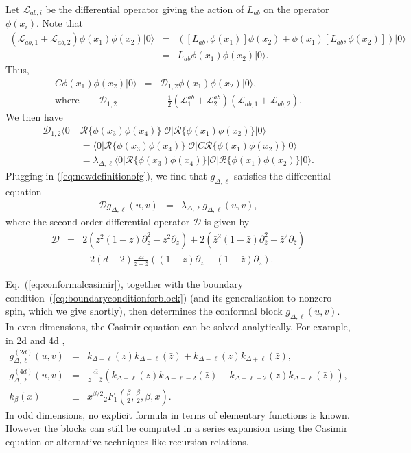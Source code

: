 \documentclass[12pt]{article}
\numberwithin{equation}{section}
\newcommand\be{\begin{eqnarray}}
\newcommand\ee{\end{eqnarray}}
\newcommand\f\phi
\newcommand\cO{\mathcal{O}}
\newcommand\p[1]{\left(#1\right)}
\newcommand\ptl\partial
\newcommand\<\langle
\renewcommand\>\rangle
\newcommand\nn{\nonumber}
\renewcommand\.{\cdot}
\newcommand\De{\Delta}
\renewcommand\l\lambda
\newcommand\cL{\mathcal{L}}
\newcommand\cD{\mathcal{D}}
\begin{document}
Let $\cL_{ab,i}$ be the differential operator giving the action of $L_{ab}$ on the operator $\f(x_i)$.  Note that
\be
(\cL_{ab,1}+\cL_{ab,2})\f(x_1)\f(x_2)|0\> &=& \p{[L_{ab},\f(x_1)]\f(x_2)+\f(x_1)[L_{ab},\f(x_2)]}|0\>\nn\\
&=& L_{ab}\f(x_1)\f(x_2)|0\>.
\ee
Thus, 
\be
C\f(x_1)\f(x_2)|0\> &=& \cD_{1,2}\f(x_1)\f(x_2)|0\>,\nn\\
\textrm{where}\qquad\cD_{1,2} &\equiv& -\frac 1 2(\cL^{ab}_{1}+\cL^{ab}_{2})(\cL_{ab,1}+\cL_{ab,2}).
\ee
We then have
\begin{align}
\cD_{1,2}\<0|&\mathcal{R}\{\f(x_3)\f(x_4)\}|\cO|\mathcal{R}\{\f(x_1)\f(x_2)\}|0\>\nn\\
&=
\<0|\mathcal{R}\{\f(x_3)\f(x_4)\}|\cO| C\mathcal{R}\{\f(x_1)\f(x_2)\}|0\>\nn\\
&= \l_{\De,\ell}\<0|\mathcal{R}\{\f(x_3)\f(x_4)\}|\cO|\mathcal{R}\{\f(x_1)\f(x_2)\}|0\>.
\end{align}
Plugging in (\ref{eq:newdefinitionofg}), we find that $g_{\De,\ell}$ satisfies the differential equation 
\be
\label{eq:conformalcasimir}
\cD g_{\De,\ell}(u,v) &=& \l_{\De,\ell} g_{\De,\ell}(u,v),
\ee
where the second-order differential operator $\cD$ is given by
\be
\cD &=& 2(z^2(1-z)\ptl_z^2-z^2 \ptl_z) + 2(\bar z^2 (1-\bar z)\ptl_{\bar z}^2-\bar z^2 \ptl_{\bar z})\nn\\
&& + 2(d-2)\frac{z\bar z}{z-\bar z}((1-z)\ptl_z - (1-\bar z)\ptl_{\bar z}).
\ee

Eq.~(\ref{eq:conformalcasimir}), together with the boundary condition~(\ref{eq:boundaryconditionforblock}) (and its generalization to nonzero spin, which we give shortly), then determines the conformal block $g_{\Delta,\ell}(u,v)$.  In even dimensions, the Casimir equation can be solved analytically.  For example, in 2d and 4d \cite{DO1,DO2},
\be
\label{eq:explicitblock2d}
g_{\De,\ell}^{(2d)}(u,v) &=& k_{\De+\ell}(z)k_{\De-\ell}(\bar z) + k_{\De-\ell}(z)k_{\De+\ell}(\bar z),\\
\label{eq:explicitblock4d}
g_{\De,\ell}^{(4d)}(u,v) &=& \frac{z \bar z}{z-\bar z}\p{k_{\De+\ell}(z)k_{\De-\ell-2}(\bar z) - k_{\De-\ell-2}(z)k_{\De+\ell}(\bar z)},\\
k_\beta(x) &\equiv& x^{\beta/2}{}_2F_1\p{\frac \beta 2, \frac \beta 2, \beta, x}.
\ee
In odd dimensions, no explicit formula in terms of elementary functions is known.  However the blocks can still be computed in a series expansion using the Casimir equation or alternative techniques like recursion relations.

\end{document}
